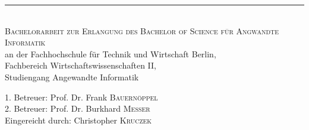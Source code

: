 \begin{titlepage}
	\begin{center} 
		\vspace*{2 cm}
		\textsc{\LARGE \mytitle}
		\rule{\textwidth}{0.4pt} \\[1.5cm]
		\textsc{\Large Bachelorarbeit zur Erlangung des Bachelor of Science f\"ur Angwandte Informatik}\\[1.5cm]
			
			an der Fachhochschule für Technik und Wirtschaft Berlin,\\
Fachbereich Wirtschaftswissenschaften II,\\
Studiengang Angewandte Informatik\\[1cm]			
		\vspace{3cm}
	\end{center}
	\begin{center}
		1. Betreuer:  Prof. Dr. Frank \textsc{Bauern\"oppel}\\ 
		2. Betreuer: Prof. Dr. Burkhard \textsc{Messer}\\[2cm]
		Eingereicht durch:  Christopher \textsc{Kruczek}		
	\end{center}
	
	\vfill
	\center {\today}
\end{titlepage}